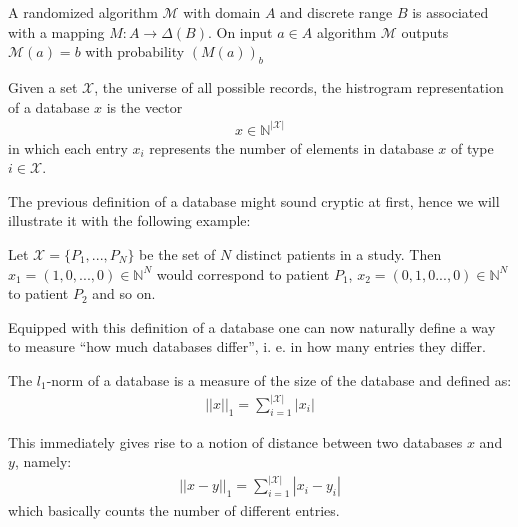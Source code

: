 \begin{definition}
    A randomized algorithm $\mathcal{M}$ with domain $A$ and discrete range $B$ is associated with a mapping $M: A \rightarrow \Delta(B)$. On input $a\in A$ algorithm $\mathcal{M}$ outputs $\mathcal{M}(a)=b$ with probability $(M(a))_b$
\end{definition}

\begin{definition}
        Given a set $\mathcal{X}$, the universe of all possible records, the histrogram representation of a database $x$ is the vector
        \begin{align}
            x \in \mathbb{N}^{|\mathcal{X}|}
        \end{align}
       in which each entry $x_i$ represents the number of elements in database $x$ of type $i\in \mathcal{X}$.
\end{definition}

The previous definition of a database might sound cryptic at first, hence we will illustrate it with the following example:
\begin{ex}
    Let $\mathcal{X}=\{P_1, ..., P_N\}$ be the set of $N$ distinct patients in a study. Then $x_1 = (1,0,...,0) \in \mathbb{N}^N$ would correspond to patient $P_1$, $x_2 = (0,1,0...,0) \in \mathbb{N}^N$ to patient $P_2$ and so on.
\end{ex}

Equipped with this definition of a database one can now naturally define a way to measure ``how much databases differ'', i. e. in how many entries they differ.

\begin{definition}
    The $l_1$-norm of a database is a measure of the size of the database and defined as:
    \begin{align}
        ||x||_1 = \sum_{i=1}^{|\mathcal{X}|} |x_i|
    \end{align}
\end{definition}

This immediately gives rise to a notion of distance between two databases $x$ and $y$, namely:
\begin{align}
    ||x-y||_1   = \sum_{i=1}^{|\mathcal{X}|} |x_i-y_i|
\end{align}
which basically counts the number of different entries.

